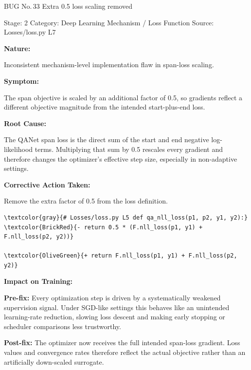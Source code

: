 \documentclass[10pt]{article}
\newcommand{\FieldLabel}[1]{%
 {\bfseries #1:}\par
}
\begin{document}
\begin{bugbox}{BUG No.\,33 \quad Extra 0.5 loss scaling removed}
{\color{MetaGray}\small Stage: 2 \;\textbar\; Category: Deep Learning Mechanism / Loss Function \;\textbar\; Source: Losses/loss.py L7\par}
\vspace{0.22em}
\FieldLabel{Nature}
Inconsistent mechanism-level implementation flaw in span-loss scaling.
\par
\vspace{0.35em}
\FieldLabel{Symptom}
The span objective is scaled by an additional factor of 0.5, so gradients reflect a different objective magnitude from the intended start-plus-end loss.
\par
\vspace{0.35em}
\FieldLabel{Root Cause}
The QANet span loss is the direct sum of the start and end negative log-likelihood terms. Multiplying that sum by 0.5 rescales every gradient and therefore changes the optimizer's effective step size, especially in non-adaptive settings.
\par
\vspace{0.35em}
\FieldLabel{Corrective Action Taken}
Remove the extra factor of 0.5 from the loss definition.
\par
\vspace{0.35em}
\begin{Verbatim}[commandchars=\\\{\},fontsize=\footnotesize,breaklines=true,breaksymbol={},frame=leftline,framerule=2pt,rulecolor=\color{gray!40},xleftmargin=6pt,formatcom=\singlespacing]
\textcolor{gray}{# Losses/loss.py L5 def qa_nll_loss(p1, p2, y1, y2):}
\textcolor{BrickRed}{- return 0.5 * (F.nll_loss(p1, y1) + F.nll_loss(p2, y2))}

\textcolor{OliveGreen}{+ return F.nll_loss(p1, y1) + F.nll_loss(p2, y2)}
\end{Verbatim}
\vspace{0.22em}
\FieldLabel{Impact on Training}
\textbf{Pre-fix:} Every optimization step is driven by a systematically weakened supervision signal. Under SGD-like settings this behaves like an unintended learning-rate reduction, slowing loss descent and making early stopping or scheduler comparisons less trustworthy.\par\smallskip
\textbf{Post-fix:} The optimizer now receives the full intended span-loss gradient. Loss values and convergence rates therefore reflect the actual objective rather than an artificially down-scaled surrogate.
\par
\vspace{0.35em}
\end{bugbox}
\end{document}
